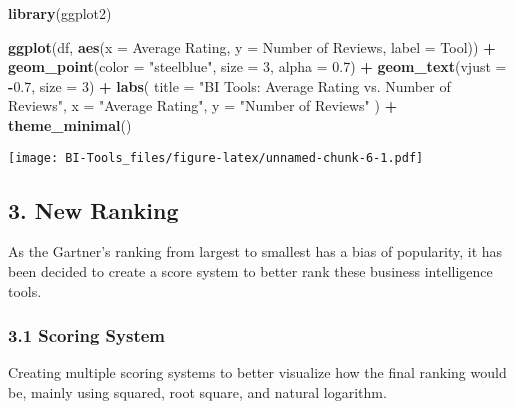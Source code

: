 \documentclass[
]{article}
\newenvironment{Shaded}{\begin{snugshade}}{\end{snugshade}}
\newcommand{\AttributeTok}[1]{\textcolor[rgb]{0.13,0.29,0.53}{#1}}
\newcommand{\DecValTok}[1]{\textcolor[rgb]{0.00,0.00,0.81}{#1}}
\newcommand{\FloatTok}[1]{\textcolor[rgb]{0.00,0.00,0.81}{#1}}
\newcommand{\FunctionTok}[1]{\textcolor[rgb]{0.13,0.29,0.53}{\textbf{#1}}}
\newcommand{\NormalTok}[1]{#1}
\newcommand{\SpecialCharTok}[1]{\textcolor[rgb]{0.81,0.36,0.00}{\textbf{#1}}}
\newcommand{\StringTok}[1]{\textcolor[rgb]{0.31,0.60,0.02}{#1}}
\begin{document}
\begin{Shaded}
\begin{Highlighting}[]
\FunctionTok{library}\NormalTok{(ggplot2)}

\FunctionTok{ggplot}\NormalTok{(df, }\FunctionTok{aes}\NormalTok{(}\AttributeTok{x =} \StringTok{\textasciigrave{}}\AttributeTok{Average Rating}\StringTok{\textasciigrave{}}\NormalTok{, }\AttributeTok{y =} \StringTok{\textasciigrave{}}\AttributeTok{Number of Reviews}\StringTok{\textasciigrave{}}\NormalTok{, }\AttributeTok{label =}\NormalTok{ Tool)) }\SpecialCharTok{+}
  \FunctionTok{geom\_point}\NormalTok{(}\AttributeTok{color =} \StringTok{"steelblue"}\NormalTok{, }\AttributeTok{size =} \DecValTok{3}\NormalTok{, }\AttributeTok{alpha =} \FloatTok{0.7}\NormalTok{) }\SpecialCharTok{+}
  \FunctionTok{geom\_text}\NormalTok{(}\AttributeTok{vjust =} \SpecialCharTok{{-}}\FloatTok{0.7}\NormalTok{, }\AttributeTok{size =} \DecValTok{3}\NormalTok{) }\SpecialCharTok{+}
  \FunctionTok{labs}\NormalTok{(}
    \AttributeTok{title =} \StringTok{"BI Tools: Average Rating vs. Number of Reviews"}\NormalTok{,}
    \AttributeTok{x =} \StringTok{"Average Rating"}\NormalTok{,}
    \AttributeTok{y =} \StringTok{"Number of Reviews"}
\NormalTok{  ) }\SpecialCharTok{+}
  \FunctionTok{theme\_minimal}\NormalTok{()}
\end{Highlighting}
\end{Shaded}

\texttt{[image: BI-Tools\_files/figure-latex/unnamed-chunk-6-1.pdf]}

\subsection{3. New Ranking}\label{new-ranking}

As the Gartner's ranking from largest to smallest has a bias of
popularity, it has been decided to create a score system to better rank
these business intelligence tools.

\subsubsection{3.1 Scoring System}\label{scoring-system}

Creating multiple scoring systems to better visualize how the final
ranking would be, mainly using squared, root square, and natural
logarithm.
\end{document}
